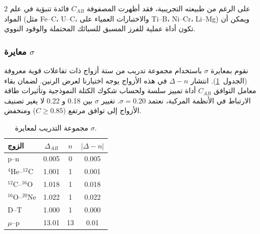 \documentclass[11pt,a4paper]{article}
\begin{document}
\begin{multicols}{2}
		على الرغم من طبيعته التجريبية، فقد أظهرت المصفوفة \(C_{AB}\) فائدة تنبؤية في علم المواد (مثل Fe–C، U–C، والاختبارات العمياء على Ti–B، Ni–Cr، Li–Mg) ويمكن أن تكون أداة عملية للفرز المسبق للسبائك المحتملة والوقود النووي.
		
		\subsubsection{معايرة \(\sigma\)}
		
		نقوم بمعايرة \(\sigma\) باستخدام مجموعة تدريب من ستة أزواج ذات تفاعلات قوية معروفة (الجدول~\ref{tab:calibration}). انتشار \(\Delta - n\) في هذه الأزواج يوجه اختيارنا لعرض الرنين. لضمان بقاء معامل التوافق \(C_{AB}\) أداة تمييز سلسة ولحساب شكوك الكتلة النموذجية وتأثيرات طاقة الارتباط في الأنظمة المركبة، نعتمد \(\sigma = 0.20\). تغيير \(\sigma\) بين 0.18 و 0.22 لا يغير تصنيف الأزواج إلى توافق مرتفع (\(C \ge 0.85\)) ومنخفض.
		
		\begin{table}[H]
			\centering
			\caption{مجموعة التدريب لمعايرة \(\sigma\).}
			\label{tab:calibration}
			\small
			\begin{tabular}{l c c c}
				\toprule
				الزوج & \(\Delta_{AB}\) & \(n\) & \(|\Delta - n|\) \\
				\midrule
				p--n    & 0.005 & 0 & 0.005 \\
				\(^4\)He--\(^{12}\)C & 1.001 & 1 & 0.001 \\
				\(^{12}\)C--\(^{16}\)O & 1.018 & 1 & 0.018 \\
				\(^{16}\)O--\(^{20}\)Ne & 1.022 & 1 & 0.022 \\
				D--T    & 1.000 & 1 & 0.000 \\
				\(\mu\)--p & 13.01 & 13 & 0.01 \\
				\bottomrule
			\end{tabular}
		\end{table}
		
	\end{multicols}
	
\end{document}
